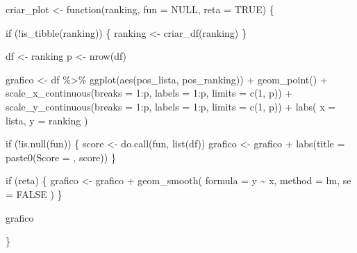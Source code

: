 \documentclass[
  letterpaper,
  DIV=11,
  numbers=noendperiod]{scrreprt}
\newenvironment{Shaded}{\begin{snugshade}}{\end{snugshade}}
\newcommand{\AttributeTok}[1]{\textcolor[rgb]{0.40,0.45,0.13}{#1}}
\newcommand{\ConstantTok}[1]{\textcolor[rgb]{0.56,0.35,0.01}{#1}}
\newcommand{\ControlFlowTok}[1]{\textcolor[rgb]{0.00,0.23,0.31}{#1}}
\newcommand{\DecValTok}[1]{\textcolor[rgb]{0.68,0.00,0.00}{#1}}
\newcommand{\FunctionTok}[1]{\textcolor[rgb]{0.28,0.35,0.67}{#1}}
\newcommand{\NormalTok}[1]{\textcolor[rgb]{0.00,0.23,0.31}{#1}}
\newcommand{\OtherTok}[1]{\textcolor[rgb]{0.00,0.23,0.31}{#1}}
\newcommand{\SpecialCharTok}[1]{\textcolor[rgb]{0.37,0.37,0.37}{#1}}
\newcommand{\StringTok}[1]{\textcolor[rgb]{0.13,0.47,0.30}{#1}}
\begin{document}
\begin{Shaded}
\begin{Highlighting}[]
\NormalTok{criar\_plot }\OtherTok{\textless{}{-}} \ControlFlowTok{function}\NormalTok{(ranking, }\AttributeTok{fun =} \ConstantTok{NULL}\NormalTok{, }\AttributeTok{reta =} \ConstantTok{TRUE}\NormalTok{) \{}
  
  \ControlFlowTok{if}\NormalTok{ (}\SpecialCharTok{!}\FunctionTok{is\_tibble}\NormalTok{(ranking)) \{}
\NormalTok{    ranking }\OtherTok{\textless{}{-}} \FunctionTok{criar\_df}\NormalTok{(ranking)}
\NormalTok{  \}}
  
\NormalTok{  df }\OtherTok{\textless{}{-}}\NormalTok{ ranking}
\NormalTok{  p }\OtherTok{\textless{}{-}} \FunctionTok{nrow}\NormalTok{(df)}
  
\NormalTok{  grafico }\OtherTok{\textless{}{-}}\NormalTok{ df }\SpecialCharTok{\%\textgreater{}\%} 
    \FunctionTok{ggplot}\NormalTok{(}\FunctionTok{aes}\NormalTok{(pos\_lista, pos\_ranking)) }\SpecialCharTok{+}
      \FunctionTok{geom\_point}\NormalTok{() }\SpecialCharTok{+}
      \FunctionTok{scale\_x\_continuous}\NormalTok{(}\AttributeTok{breaks =} \DecValTok{1}\SpecialCharTok{:}\NormalTok{p, }\AttributeTok{labels =} \DecValTok{1}\SpecialCharTok{:}\NormalTok{p, }\AttributeTok{limits =} \FunctionTok{c}\NormalTok{(}\DecValTok{1}\NormalTok{, p)) }\SpecialCharTok{+}
      \FunctionTok{scale\_y\_continuous}\NormalTok{(}\AttributeTok{breaks =} \DecValTok{1}\SpecialCharTok{:}\NormalTok{p, }\AttributeTok{labels =} \DecValTok{1}\SpecialCharTok{:}\NormalTok{p, }\AttributeTok{limits =} \FunctionTok{c}\NormalTok{(}\DecValTok{1}\NormalTok{, p)) }\SpecialCharTok{+}
      \FunctionTok{labs}\NormalTok{(}
        \AttributeTok{x =} \StringTok{\textquotesingle{}lista\textquotesingle{}}\NormalTok{,}
        \AttributeTok{y =} \StringTok{\textquotesingle{}ranking\textquotesingle{}}
\NormalTok{      )}
  
  \ControlFlowTok{if}\NormalTok{ (}\SpecialCharTok{!}\FunctionTok{is.null}\NormalTok{(fun)) \{}
\NormalTok{    score }\OtherTok{\textless{}{-}} \FunctionTok{do.call}\NormalTok{(fun, }\FunctionTok{list}\NormalTok{(df))}
\NormalTok{    grafico }\OtherTok{\textless{}{-}}\NormalTok{ grafico }\SpecialCharTok{+} \FunctionTok{labs}\NormalTok{(}\AttributeTok{title =} \FunctionTok{paste0}\NormalTok{(}\StringTok{\textquotesingle{}Score = \textquotesingle{}}\NormalTok{, score))}
\NormalTok{  \}}
  
  \ControlFlowTok{if}\NormalTok{ (reta) \{}
\NormalTok{    grafico }\OtherTok{\textless{}{-}}\NormalTok{ grafico }\SpecialCharTok{+}
      \FunctionTok{geom\_smooth}\NormalTok{(}
        \AttributeTok{formula =}\NormalTok{ y }\SpecialCharTok{\textasciitilde{}}\NormalTok{ x,}
        \AttributeTok{method =} \StringTok{\textquotesingle{}lm\textquotesingle{}}\NormalTok{,}
        \AttributeTok{se =} \ConstantTok{FALSE}
\NormalTok{      )}
\NormalTok{  \}}
  
\NormalTok{  grafico}

\NormalTok{\}}
\end{Highlighting}
\end{Shaded}
\end{document}
